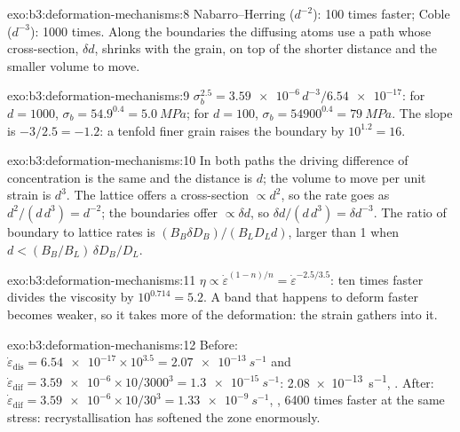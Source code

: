 \begin{solution}{exo:b3:deformation-mechanisms:8}
Nabarro--Herring ($d^{-2}$): 100 times faster; Coble ($d^{-3}$): 1000 times.
Along the boundaries the diffusing atoms use a path whose cross-section, $\delta
d$, shrinks with the grain, on top of the shorter distance and the smaller
volume to move.
\end{solution}

\begin{solution}{exo:b3:deformation-mechanisms:9}
$\sigma_b^{2.5} = \num{3.59e-6}\,d^{-3}/\num{6.54e-17}$: for $d = 1000$,
$\sigma_b = 54.9^{0.4} = \qty{5.0}{MPa}$; for $d = 100$, $\sigma_b =
\num{54900}^{0.4} = \qty{79}{MPa}$. The slope is $-3/2.5 = -1.2$: a tenfold
finer grain raises the boundary by $10^{1.2} = 16$.
\end{solution}

\begin{solution}{exo:b3:deformation-mechanisms:10}
In both paths the driving difference of concentration is the same and the
distance is $d$; the volume to move per unit strain is $d^3$. The lattice
offers a cross-section $\propto d^2$, so the rate goes as $d^2/(d\,d^3) =
d^{-2}$; the boundaries offer $\propto\delta d$, so $\delta d/(d\,d^3) = \delta
d^{-3}$. The ratio of boundary to lattice rates is $(B_B\delta D_B)/(B_LD_Ld)$,
larger than 1 when $d < (B_B/B_L)\,\delta D_B/D_L$.
\end{solution}

\begin{solution}{exo:b3:deformation-mechanisms:11}
$\eta \propto \dot\varepsilon^{(1-n)/n} = \dot\varepsilon^{-2.5/3.5}$: ten times
faster divides the viscosity by $10^{0.714} = 5.2$. A band that happens to
deform faster becomes weaker, so it takes more of the deformation: the strain
gathers into it.
\end{solution}

\begin{solution}{exo:b3:deformation-mechanisms:12}
Before: $\dot\varepsilon_{\mathrm{dis}} = \num{6.54e-17}\times10^{3.5} =
\qty{2.07e-13}{s^{-1}}$ and $\dot\varepsilon_{\mathrm{dif}} = \num{3.59e-6}
\times10/3000^3 = \qty{1.3e-15}{s^{-1}}$: \qty{2.08e-13}{s^{-1}}, . After: $\dot\varepsilon_{\mathrm{dif}} = \num{3.59e-6}\times10/30^3 =
\qty{1.33e-9}{s^{-1}}$, , \num{6400} times faster at the same
stress: recrystallisation has softened the zone enormously.
\end{solution}

